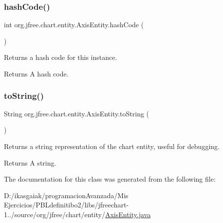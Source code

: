 \subsubsection{\texorpdfstring{hash\+Code()}{hashCode()}}
{\footnotesize\ttfamily int org.\+jfree.\+chart.\+entity.\+Axis\+Entity.\+hash\+Code (\begin{DoxyParamCaption}{ }\end{DoxyParamCaption})}

Returns a hash code for this instance.

\begin{DoxyReturn}{Returns}
A hash code. 
\end{DoxyReturn}
\mbox{\label{classorg_1_1jfree_1_1chart_1_1entity_1_1_axis_entity_a37c00e97ee05bce8d81f789584b95694}} 
\subsubsection{\texorpdfstring{to\+String()}{toString()}}
{\footnotesize\ttfamily String org.\+jfree.\+chart.\+entity.\+Axis\+Entity.\+to\+String (\begin{DoxyParamCaption}{ }\end{DoxyParamCaption})}

Returns a string representation of the chart entity, useful for debugging.

\begin{DoxyReturn}{Returns}
A string. 
\end{DoxyReturn}


The documentation for this class was generated from the following file\+:\begin{DoxyCompactItemize}
\item 
D\+:/ikasgaiak/programacion\+Avanzada/\+Mis Ejercicios/\+P\+B\+Ldefinitibo2/libs/jfreechart-\/1../source/org/jfree/chart/entity/\mbox{\hyperlink{_axis_entity_8java}{Axis\+Entity.\+java}}\end{DoxyCompactItemize}
